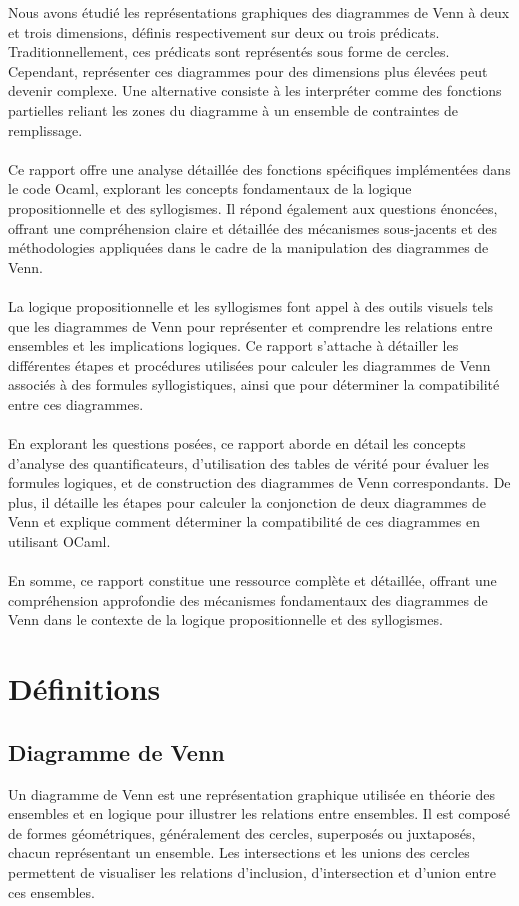 \documentclass{article}
\begin{document}
Nous avons étudié les représentations graphiques des diagrammes de Venn à deux et trois dimensions, définis respectivement sur deux ou trois prédicats. Traditionnellement, ces prédicats sont représentés sous forme de cercles. Cependant, représenter ces diagrammes pour des dimensions plus élevées peut devenir complexe. Une alternative consiste à les interpréter comme des fonctions partielles reliant les zones du diagramme à un ensemble de contraintes de remplissage.
\\\\
Ce rapport offre une analyse détaillée des fonctions spécifiques implémentées dans le code Ocaml, explorant les concepts fondamentaux de la logique propositionnelle et des syllogismes. Il répond également aux questions énoncées, offrant une compréhension claire et détaillée des mécanismes sous-jacents et des méthodologies appliquées dans le cadre de la manipulation des diagrammes de Venn.
\\\\
La logique propositionnelle et les syllogismes font appel à des outils visuels tels que les diagrammes de Venn pour représenter et comprendre les relations entre ensembles et les implications logiques. Ce rapport s'attache à détailler les différentes étapes et procédures utilisées pour calculer les diagrammes de Venn associés à des formules syllogistiques, ainsi que pour déterminer la compatibilité entre ces diagrammes.
\\\\
En explorant les questions posées, ce rapport aborde en détail les concepts d'analyse des quantificateurs, d'utilisation des tables de vérité pour évaluer les formules logiques, et de construction des diagrammes de Venn correspondants. De plus, il détaille les étapes pour calculer la conjonction de deux diagrammes de Venn et explique comment déterminer la compatibilité de ces diagrammes en utilisant OCaml.
\\\\
En somme, ce rapport constitue une ressource complète et détaillée, offrant une compréhension approfondie des mécanismes fondamentaux des diagrammes de Venn dans le contexte de la logique propositionnelle et des syllogismes.

\newpage

\section{Définitions}

\subsection{\textbf{Diagramme de Venn}}
Un diagramme de Venn est une représentation graphique utilisée en théorie des ensembles et en logique pour illustrer les relations entre ensembles. Il est composé de formes géométriques, généralement des cercles, superposés ou juxtaposés, chacun représentant un ensemble. Les intersections et les unions des cercles permettent de visualiser les relations d'inclusion, d'intersection et d'union entre ces ensembles.
\end{document}
